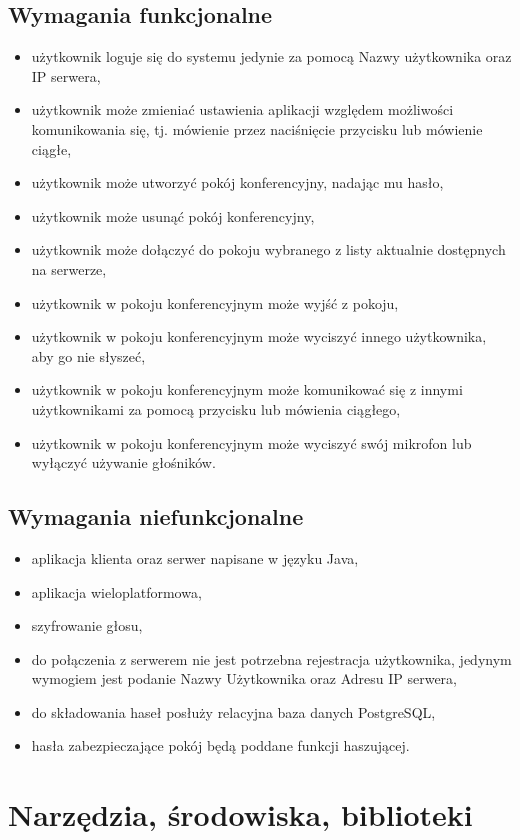 \documentclass[12pt,a4paper,notitlepage]{report}
\begin{document}
	\subsection{Wymagania funkcjonalne}
	\begin{itemize}
		\item użytkownik loguje się do systemu jedynie za pomocą Nazwy użytkownika oraz IP serwera,
		\item użytkownik może zmieniać ustawienia aplikacji względem możliwości komunikowania się, tj. mówienie przez naciśnięcie przycisku lub mówienie ciągłe,
		\item użytkownik może utworzyć pokój konferencyjny, nadając mu hasło,
		\item użytkownik może usunąć pokój konferencyjny,
		\item użytkownik może dołączyć do pokoju wybranego z listy aktualnie dostępnych na serwerze,
		\item użytkownik w pokoju konferencyjnym może wyjść z pokoju,
		\item użytkownik w pokoju konferencyjnym może wyciszyć innego użytkownika, aby go nie słyszeć,
		\item użytkownik w pokoju konferencyjnym może komunikować się z innymi użytkownikami za pomocą przycisku lub mówienia ciągłego,
		\item użytkownik w pokoju konferencyjnym może wyciszyć swój mikrofon lub wyłączyć używanie głośników.
	\end{itemize}
	\subsection{Wymagania niefunkcjonalne}
	\begin{itemize}
		\item aplikacja klienta oraz serwer napisane w języku Java,
		\item aplikacja wieloplatformowa,
		\item szyfrowanie głosu,
		\item do połączenia z serwerem nie jest potrzebna rejestracja użytkownika, jedynym wymogiem jest podanie Nazwy Użytkownika oraz Adresu IP serwera,
		\item do składowania haseł posłuży relacyjna baza danych PostgreSQL,
		\item hasła zabezpieczające pokój będą poddane funkcji haszującej.
	\end{itemize}
	\section{Narzędzia, środowiska, biblioteki}
\end{document}
